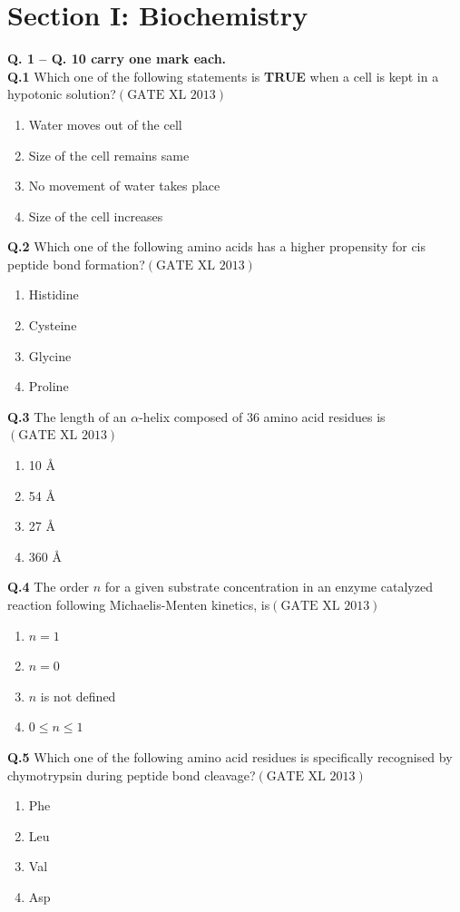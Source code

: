 \documentclass[12pt]{article}
\theoremstyle{remark}
\providecommand{\brak}[1]{\ensuremath{\left(#1\right)}}
\begin{document}
\clearpage
\section*{Section I: Biochemistry}
\noindent\textbf{Q. 1 – Q. 10 carry one mark each.}\\

\textbf{Q.1} Which one of the following statements is \textbf{TRUE} when a cell is kept in a hypotonic solution?\hfill $\brak{\text{GATE XL 2013}}$
\begin{enumerate}
    \item Water moves out of the cell
    \item Size of the cell remains same
    \item No movement of water takes place
    \item Size of the cell increases
\end{enumerate}

\textbf{Q.2} Which one of the following amino acids has a higher propensity for cis peptide bond formation?\hfill $\brak{\text{GATE XL 2013}}$
\begin{enumerate}
    \item Histidine
    \item Cysteine
    \item Glycine
    \item Proline
\end{enumerate}

\textbf{Q.3} The length of an $\alpha$-helix composed of 36 amino acid residues is\hfill $\brak{\text{GATE XL 2013}}$
\begin{enumerate}
    \item 10 Å
    \item 54 Å
    \item 27 Å
    \item 360 Å
\end{enumerate}

\textbf{Q.4} The order $n$ for a given substrate concentration in an enzyme catalyzed reaction following Michaelis-Menten kinetics, is\hfill $\brak{\text{GATE XL 2013}}$
\begin{enumerate}
    \item $n = 1$
    \item $n = 0$
    \item $n$ is not defined
    \item $0 \leq n \leq 1$
\end{enumerate}

\textbf{Q.5} Which one of the following amino acid residues is specifically recognised by chymotrypsin during peptide bond cleavage?\hfill $\brak{\text{GATE XL 2013}}$
\begin{enumerate}
    \item Phe
    \item Leu
    \item Val
    \item Asp
\end{enumerate}
\end{document}
